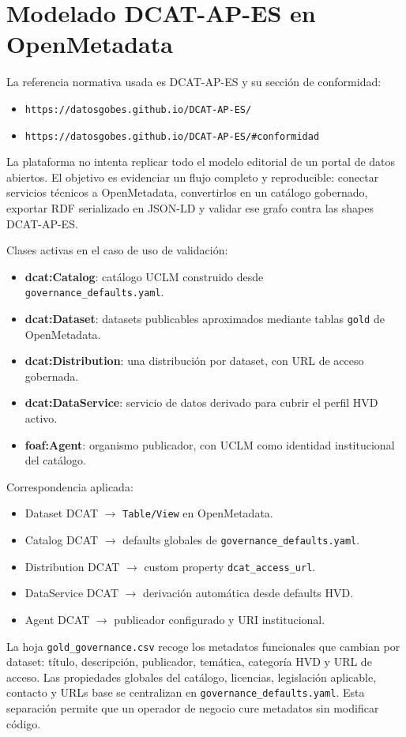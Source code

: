 \section{Modelado DCAT-AP-ES en OpenMetadata}

La referencia normativa usada es DCAT-AP-ES y su sección de conformidad:
\begin{itemize}
  \item \texttt{https://datosgobes.github.io/DCAT-AP-ES/}
  \item \texttt{https://datosgobes.github.io/DCAT-AP-ES/\#conformidad}
\end{itemize}

La plataforma no intenta replicar todo el modelo editorial de un portal de datos abiertos. El objetivo es evidenciar un flujo completo y reproducible: conectar servicios técnicos a OpenMetadata, convertirlos en un catálogo gobernado, exportar RDF serializado en JSON-LD y validar ese grafo contra las shapes DCAT-AP-ES.

Clases activas en el caso de uso de validación:
\begin{itemize}
  \item \textbf{dcat:Catalog}: catálogo UCLM construido desde \texttt{governance\_defaults.yaml}.
  \item \textbf{dcat:Dataset}: datasets publicables aproximados mediante tablas \texttt{gold} de OpenMetadata.
  \item \textbf{dcat:Distribution}: una distribución por dataset, con URL de acceso gobernada.
  \item \textbf{dcat:DataService}: servicio de datos derivado para cubrir el perfil HVD activo.
  \item \textbf{foaf:Agent}: organismo publicador, con UCLM como identidad institucional del catálogo.
\end{itemize}

Correspondencia aplicada:
\begin{itemize}
  \item Dataset DCAT $\rightarrow$ \texttt{Table/View} en OpenMetadata.
  \item Catalog DCAT $\rightarrow$ defaults globales de \texttt{governance\_defaults.yaml}.
  \item Distribution DCAT $\rightarrow$ custom property \texttt{dcat\_access\_url}.
  \item DataService DCAT $\rightarrow$ derivación automática desde defaults HVD.
  \item Agent DCAT $\rightarrow$ publicador configurado y URI institucional.
\end{itemize}

La hoja \texttt{gold\_governance.csv} recoge los metadatos funcionales que cambian por dataset: título, descripción, publicador, temática, categoría HVD y URL de acceso. Las propiedades globales del catálogo, licencias, legislación aplicable, contacto y URLs base se centralizan en \texttt{governance\_defaults.yaml}. Esta separación permite que un operador de negocio cure metadatos sin modificar código.
